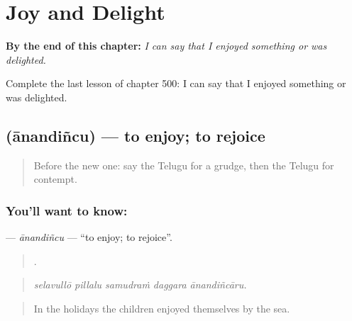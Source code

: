 
\chapter{Joy and Delight}
\label{ch:te-joy-and-delight}

\begin{chapteropening}
\textbf{By the end of this chapter:} \emph{I can say that I enjoyed something or was delighted.}

Complete the last lesson of chapter 500: I can say that I enjoyed something or was delighted.
\end{chapteropening}

\section[\texorpdfstring{\te{ఆనందించు} (ānandiñcu)}{ఆనందించు (ānandiñcu)}]{ (ānandiñcu) — to enjoy; to rejoice}

\label{lesson:TE-C500-anandincu}



\begin{quote}
Before the new one: say the Telugu for a grudge, then the Telugu for contempt.
\end{quote}

\subsection*{You'll want to know: }
\textbf{} — \emph{ānandiñcu} — \textquotedblleft{}to enjoy; to rejoice\textquotedblright{}.

\begin{quote}
    .
\end{quote}

\begin{quote}
\emph{selavullō pillalu samudraṁ daggara ānandiñcāru.}
\end{quote}

\begin{quote}
In the holidays the children enjoyed themselves by the sea.
\end{quote}

